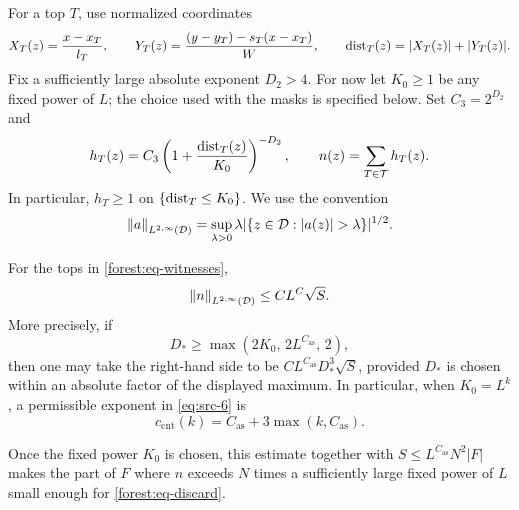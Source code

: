 For a top \(T\), use normalized coordinates
\begin{equation}\label{forest:eq-coordinates}
 X_T(z)=\frac{x-x_T}{l_T},\qquad
 Y_T(z)=\frac{(y-y_T)-s_T(x-x_T)}{W},\qquad
 \operatorname{dist}_T(z)=|X_T(z)|+|Y_T(z)|.
\end{equation}
Fix a sufficiently large absolute exponent \(D_2>4\). For now let
\(K_0\ge1\) be any fixed power of \(L\); the choice used with
the masks is specified below. Set \(C_3=2^{D_2}\) and
\begin{equation}\label{eq:src-5}
 h_T(z)=C_3\left(1+\frac{\operatorname{dist}_T(z)}{K_0}\right)^{-D_2},
 \qquad n(z)=\sum_{T\in\mathcal T}h_T(z).
\end{equation}
In particular, \(h_T\ge1\) on \(\{\operatorname{dist}_T\le K_0\}\).
We use the convention
\[
 \norm{a}_{L^{2,\infty}(\mathcal D)}
 =\sup_{\lambda>0}\lambda
   |\{z\in\mathcal D:|a(z)|>\lambda\}|^{1/2}.
\]

\begin{proposition}\label{forest:prop-count}
For the tops in \eqref{forest:eq-witnesses},
\begin{equation}\label{eq:src-6}
 \left\|n\right\|_{L^{2,\infty}(\mathcal D)}
       \le C L^C\sqrt S.
\end{equation}
More precisely, if
\[
 D_*\ge\max(2K_0,\,2L^{C_{\mathrm{as}}},\,2),
\]
then one may take the right-hand side to be
\(C L^{C_{\mathrm{as}}}D_*^3\sqrt S\), provided \(D_*\)
is chosen within an absolute factor of the displayed maximum.
In particular, when \(K_0=L^k\), a permissible exponent in
\eqref{eq:src-6} is
\begin{equation}\label{forest:eq-count-exponent}
 c_{\mathrm{cnt}}(k)
     =C_{\mathrm{as}}+3\max(k,C_{\mathrm{as}}).
\end{equation}
\end{proposition}

Once the fixed power \(K_0\) is chosen, this estimate together with
\(S\le L^{C_{\mathrm{as}}}N^2|F|\) makes the part of \(F\) where
\(n\) exceeds \(N\) times a sufficiently large fixed power of \(L\)
small enough for \eqref{forest:eq-discard}.

